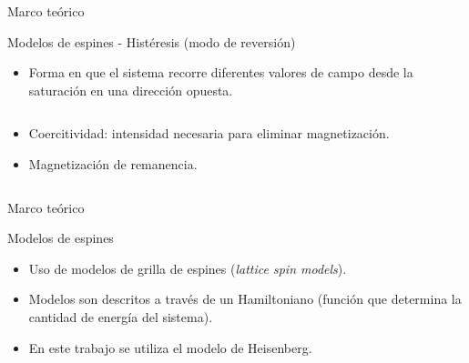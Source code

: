 \begin{frame}{Marco teórico}
\begin{block}{Modelos de espines - Histéresis (modo de reversión)}
\begin{itemize}
  \item Forma en que el sistema recorre diferentes valores de campo desde la saturación en una dirección opuesta.
\end{itemize}

\begin{columns}

  \begin{column}{.50\textwidth}
\begin{itemize}
  \item Coercitividad: intensidad necesaria para eliminar magnetización.
  \item Magnetización de remanencia.
\end{itemize}
  \end{column}
  
  \begin{column}{.50\textwidth}
	\centerline{}
  \end{column}
  
\end{columns}




\end{block}
\end{frame}

\begin{frame}{Marco teórico}
\begin{block}{Modelos de espines}
\begin{itemize}
  \item Uso de modelos de grilla de espines (\textit{lattice spin models}).
  \item Modelos son descritos a través de un Hamiltoniano (función que determina la cantidad de energía del sistema).
  \item En este trabajo se utiliza el modelo de Heisenberg.
\end{itemize}
\end{block}
\end{frame}

